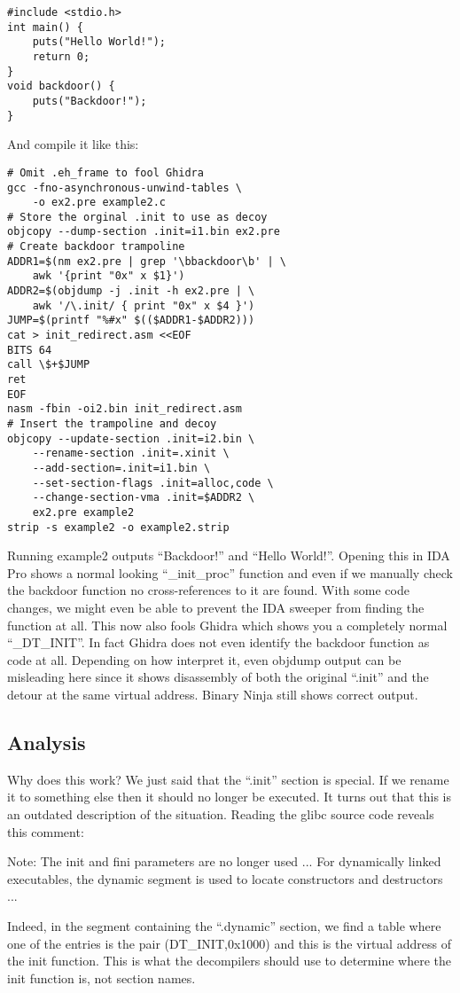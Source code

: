 \documentclass[twocolumn]{article}
\begin{document}
\begin{verbatim}
#include <stdio.h>
int main() {
    puts("Hello World!");
    return 0;
}
void backdoor() {
    puts("Backdoor!");
}
\end{verbatim}

And compile it like this:

\begin{verbatim}
# Omit .eh_frame to fool Ghidra
gcc -fno-asynchronous-unwind-tables \
    -o ex2.pre example2.c
# Store the orginal .init to use as decoy
objcopy --dump-section .init=i1.bin ex2.pre
# Create backdoor trampoline
ADDR1=$(nm ex2.pre | grep '\bbackdoor\b' | \
    awk '{print "0x" x $1}')
ADDR2=$(objdump -j .init -h ex2.pre | \
    awk '/\.init/ { print "0x" x $4 }')
JUMP=$(printf "%#x" $(($ADDR1-$ADDR2)))
cat > init_redirect.asm <<EOF
BITS 64
call \$+$JUMP
ret
EOF
nasm -fbin -oi2.bin init_redirect.asm
# Insert the trampoline and decoy
objcopy --update-section .init=i2.bin \
    --rename-section .init=.xinit \
    --add-section=.init=i1.bin \
    --set-section-flags .init=alloc,code \
    --change-section-vma .init=$ADDR2 \
    ex2.pre example2
strip -s example2 -o example2.strip
\end{verbatim}

Running example2 outputs ``Backdoor!'' and ``Hello World!''. Opening this in IDA Pro shows a normal looking ``\_init\_proc'' function and even if we manually check the backdoor function no cross-references to it are found. With some code changes, we might even be able to prevent the IDA sweeper from finding the function at all.
This now also fools Ghidra which shows you a completely normal ``\_DT\_INIT''. In fact Ghidra does not even identify the backdoor function as code at all. Depending on how interpret it, even objdump output can be misleading here since it shows disassembly of both the original ``.init'' and the detour at the same virtual address. Binary Ninja still shows correct output.

\vspace*{-0.5\baselineskip}
\subsection*{Analysis}

Why does this work? We just said that the ``.init'' section is special. If we rename it to something else then it should no longer be executed. It turns out that this is an outdated description of the situation. Reading the glibc source code reveals this comment:

\begin{displayquote}
   Note: The init and fini parameters are no longer used ...
   For dynamically linked executables, the dynamic segment is used to
   locate constructors and destructors ...
\end{displayquote}

Indeed, in the segment containing the ``.dynamic'' section, we find a table where one of the entries is the pair (DT\_INIT,0x1000) and this is the virtual address of the init function. This is what the decompilers should use to determine where the init function is, not section names.

\end{document}
